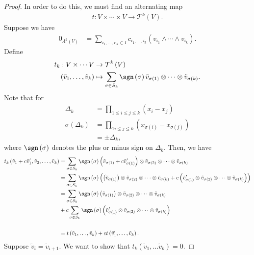 \documentclass[10pt]{mypackage}
\begin{document}
\begin{proof}
      In order to do this, we must find an alternating map
      \begin{align*}
        t: V\times\cdots\times V \rightarrow \mathcal{T}^{k}\left(V\right).
      \end{align*}
      Suppose we have
      \begin{align*}
        0_{\Lambda^{k}\left(V\right)} &= \sum_{i_1,\dots,e_k\in I}c_{i_{1},\dots,i_{k}}\left(v_{i_1}\wedge\cdots\wedge v_{i_k}\right).
      \end{align*}
      Define
      \begin{align*}
        t_k: V\times\cdots V &\rightarrow \mathcal{T}^{k}\left(V\right)\\
        \left(\tilde{v}_1,\dots,\tilde{v}_k\right) &\mapsto \sum_{\sigma\in S_{k}}\sgn\left(\sigma\right) \tilde{v}_{\sigma(1)}\otimes\cdots\otimes \tilde{v}_{\sigma(k)}.
      \end{align*}
      Note that for
      \begin{align*}
        \Delta_{k} &= \prod_{1\leq i\leq j \leq k}\left(x_{i} - x_{j}\right)\\
        \sigma\left(\Delta_{k}\right) &= \prod_{1i\leq j \leq k}\left(x_{\sigma(i)} - x_{\sigma(j)}\right)\\
                                      &= \pm \Delta_{k},
      \end{align*}
      where $\sgn\left(\sigma\right)$ denotes the plus or minus sign on $\Delta_k$. Then, we have
      \begin{align*}
        t_{k}\left(\tilde{v}_1 + c\tilde{v}_1',\tilde{v}_2,\dots,\tilde{v}_k\right) &= \sum_{\sigma\in S_k}\sgn\left(\sigma\right)\left(\tilde{v}_{\sigma(1)} + c\tilde{v}_{\sigma(1)}'\right)\otimes \tilde{v}_{\sigma(2)}\otimes\cdots\otimes \tilde{v}_{\sigma(k)}\\
        &= \sum_{\sigma\in S_k}\sgn\left(\sigma\right)\left(\left(\tilde{v}_{\sigma(1)}\right)\otimes \tilde{v}_{\sigma(2)}\otimes\cdots\otimes \tilde{v}_{\sigma(k)}  + c\left(\tilde{v}_{\sigma(1)}'\otimes \tilde{v}_{\sigma(2)}\otimes\cdots\otimes \tilde{v}_{\sigma(k)}\right)\right)\\
        &= \sum_{\sigma\in S_k}\sgn\left(\sigma\right)\left(\tilde{v}_{\sigma(1)}\right)\otimes \tilde{v}_{\sigma(2)}\otimes\cdots\otimes \tilde{v}_{\sigma(k)} \\
        &+ c\sum_{\sigma\in S_k}\sgn\left(\sigma\right)\left(\tilde{v}_{\sigma(1)}'\otimes \tilde{v}_{\sigma(2)}\otimes\cdots\otimes \tilde{v}_{\sigma(k)}\right)\\
        \\
        &= t\left(\tilde{v}_{1},\dots,\tilde{v}_{k}\right) + ct\left(\tilde{v}_1',\dots,\tilde{v}_{k}\right).
      \end{align*}
      Suppose $\tilde{v}_{i} = \tilde{v}_{i+1}$. We want to show that $t_{k}\left(\tilde{v}_{1},\dots\tilde{v}_{k}\right) = 0$.\newline


\end{proof}
\end{document}

